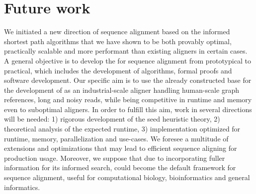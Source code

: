 \section*{Future work}

We initiated a new direction of sequence alignment based on the informed
shortest path algorithms \A that we have shown to be both provably optimal,
practically scalable and more performant than existing aligners in certain
cases. A general objective is to develop the \A for sequence alignment from
prototypical to practical, which includes the development of algorithms, formal
proofs and software development. Our specific aim is to use the already
constructed base for the development of \astarix as an industrial-scale aligner
handling human-scale graph references, long and noisy reads, while being
competitive in runtime and memory even to suboptimal aligners. In order to
fulfill this aim, work in several directions will be needed: 1) rigorous
development of the seed heuristic theory, 2) theoretical analysis of the
expected runtime, 3) implementation optimized for runtime, memory,
parallelization and use-cases. We foresee a multitude of extensions and
optimizations that may lead to efficient sequence aligning for production usage.
Moreover, we suppose that due to incorporating fuller information for its
informed search, \A could become the default framework for sequence alignment,
useful for computational biology, bioinformatics and general informatics.

